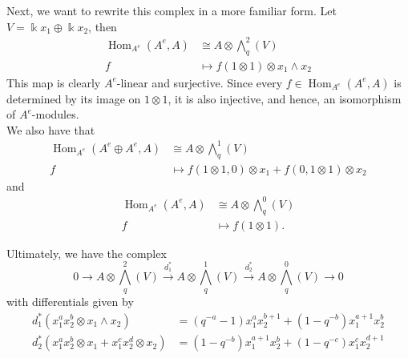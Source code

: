 \documentclass[12pt,a4paper]{article}
\DeclareMathOperator{\Hom}{Hom}
\newcommand{\Wedge}{\textstyle\bigwedge}
\newcommand{\kk}{\Bbbk}
\newcommand\1{_{(1)}}
\newcommand\2{_{(2)}}
\begin{document}
Next, we want to rewrite this complex in a more familiar form.
Let $V=\kk x_1\oplus \kk x_2$, then
\begin{align*}
\Hom_{A^e}(A^e,A)&\cong A\otimes \Wedge^2_q (V)\\
f&\mapsto f(1\otimes 1)\otimes x_1\wedge x_2
\end{align*}
This map is clearly $A^e$-linear and surjective.
Since every $f\in \Hom_{A^e}(A^e,A)$ is determined by its image on $1\otimes 1$, it is also injective, and hence, an isomorphism of $A^e$-modules.
\\

We also have that
\begin{align*}
\Hom_{A^e}(A^e\oplus A^e,A)&\cong A\otimes \Wedge_q^1(V)\\
f&\mapsto f(1\otimes 1,0)\otimes x_1+f(0,1\otimes 1)\otimes x_2
\end{align*}
and
\begin{align*}
\Hom_{A^e}(A^e,A)&\cong A\otimes \Wedge_q^0 (V)\\
f&\mapsto f(1\otimes 1).
\end{align*}

Ultimately, we have the complex
\[
0 \to A\otimes \Wedge_q^2(V)\xrightarrow{d_1^*}A\otimes \Wedge_q^1(V)\xrightarrow{d_2^*}A\otimes \Wedge_q^0(V)\to 0
\]
with differentials given by
\begin{align*}
d_1^*(x_1^ax_2^b\otimes x_1\wedge x_2)&=(q^{-a}-1)x_1^ax_2^{b+1}+(1-q^{-b})x_1^{a+1}x_2^b\\
d_2^*(x_1^ax_2^b\otimes x_1+x_1^cx_2^d\otimes x_2)&=(1-q^{-b})x_1^{a+1}x_2^b+(1-q^{-c})x_1^cx_2^{d+1}
\end{align*}
\end{document}
